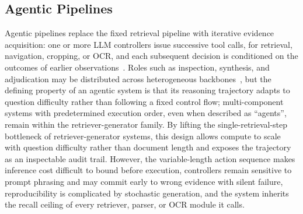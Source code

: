\documentclass[11pt]{article}
\begin{document}
\subsection{Agentic Pipelines}
\label{sec:arch-agentic}
Agentic pipelines replace the fixed retrieval pipeline with iterative evidence acquisition: one or more LLM controllers issue successive tool calls, for retrieval, navigation, cropping, or OCR, and each subsequent decision is conditioned on the outcomes of earlier observations~\cite{zheng2026docvstar,sun2025docagent}. Roles such as inspection, synthesis, and adjudication may be distributed across heterogeneous backbones~\cite{yu2025mact,wang2025vidorag}, but the defining property of an agentic system is that its reasoning trajectory adapts to question difficulty rather than following a fixed control flow; multi-component systems with predetermined execution order, even when described as ``agents'', remain within the retriever-generator family. By lifting the single-retrieval-step bottleneck of retriever-generator systems, this design allows compute to scale with question difficulty rather than document length and exposes the trajectory as an inspectable audit trail. However, the variable-length action sequence makes inference cost difficult to bound before execution, controllers remain sensitive to prompt phrasing and may commit early to wrong evidence with silent failure, reproducibility is complicated by stochastic generation, and the system inherits the recall ceiling of every retriever, parser, or OCR module it calls.
\end{document}
